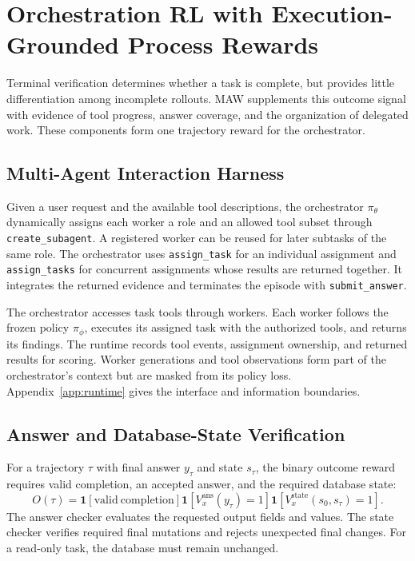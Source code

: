 \section{Orchestration RL with Execution-Grounded Process Rewards}
\label{sec:learning}

Terminal verification determines whether a task is complete, but provides little differentiation among incomplete rollouts. MAW supplements this outcome signal with evidence of tool progress, answer coverage, and the organization of delegated work. These components form one trajectory reward for the orchestrator.

\subsection{Multi-Agent Interaction Harness}

Given a user request and the available tool descriptions, the orchestrator $\pi_\theta$ dynamically assigns each worker a role and an allowed tool subset through \texttt{create\_subagent}. A registered worker can be reused for later subtasks of the same role. The orchestrator uses \texttt{assign\_task} for an individual assignment and \texttt{assign\_tasks} for concurrent assignments whose results are returned together. It integrates the returned evidence and terminates the episode with \texttt{submit\_answer}.

The orchestrator accesses task tools through workers. Each worker follows the frozen policy $\pi_\phi$, executes its assigned task with the authorized tools, and returns its findings. The runtime records tool events, assignment ownership, and returned results for scoring. Worker generations and tool observations form part of the orchestrator's context but are masked from its policy loss. Appendix~\ref{app:runtime} gives the interface and information boundaries.

\subsection{Answer and Database-State Verification}
\label{sec:outcome}

For a trajectory $\tau$ with final answer $y_\tau$ and state $s_\tau$, the binary outcome reward requires valid completion, an accepted answer, and the required database state:
\begin{equation}
 O(\tau)=\mathbf 1[\mathrm{valid\ completion}]
 \mathbf 1[V_x^{\mathrm{ans}}(y_\tau)=1]
 \mathbf 1[V_x^{\mathrm{state}}(s_0,s_\tau)=1].
 \label{eq:outcome}
\end{equation}
The answer checker evaluates the requested output fields and values. The state checker verifies required final mutations and rejects unexpected final changes. For a read-only task, the database must remain unchanged.

